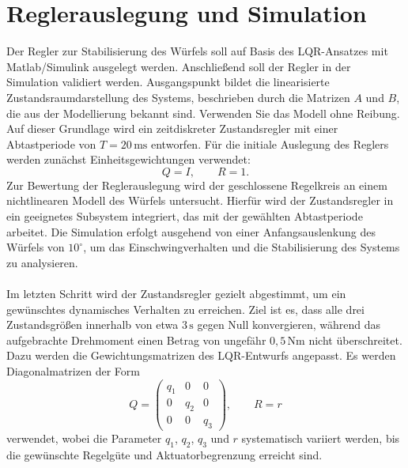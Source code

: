\chapter{Reglerauslegung und Simulation}
    \label{ch:Simulink}
    Der Regler zur Stabilisierung des Würfels soll auf Basis des LQR-Ansatzes mit Matlab/Simulink ausgelegt werden. Anschließend soll der Regler in der Simulation validiert werden. Ausgangspunkt bildet die linearisierte Zustandsraumdarstellung des Systems, beschrieben durch die Matrizen $A$ und $B$, die aus der Modellierung bekannt sind. Verwenden Sie das Modell ohne Reibung. Auf dieser Grundlage wird ein zeitdiskreter Zustandsregler mit einer Abtastperiode von $T = 20\,\mathrm{ms}$ entworfen. Für die initiale Auslegung des Reglers werden zunächst Einheitsgewichtungen verwendet:
    \[
        Q = I, \qquad R = 1.
    \]
    Zur Bewertung der Reglerauslegung wird der geschlossene Regelkreis an einem nichtlinearen Modell des Würfels untersucht. Hierfür wird der Zustandsregler in ein geeignetes Subsystem integriert, das mit der gewählten Abtastperiode arbeitet. Die Simulation erfolgt ausgehend von einer Anfangsauslenkung des Würfels von $10^\circ$, um das Einschwingverhalten und die Stabilisierung des Systems zu analysieren.\\
    \\
    Im letzten Schritt wird der Zustandsregler gezielt abgestimmt, um ein gewünschtes dynamisches Verhalten zu erreichen. Ziel ist es, dass alle drei Zustandsgrößen innerhalb von etwa $3\,\mathrm{s}$ gegen Null konvergieren, während das aufgebrachte Drehmoment einen Betrag von ungefähr $0{,}5\,\mathrm{Nm}$ nicht überschreitet. Dazu werden die Gewichtungsmatrizen des LQR-Entwurfs angepasst. Es werden Diagonalmatrizen der Form
    \[
        Q =
        \begin{pmatrix}
            q_1 & 0   & 0 \\
            0   & q_2 & 0 \\
            0   & 0   & q_3
        \end{pmatrix},
        \qquad
        R = r
    \]
    verwendet, wobei die Parameter $q_1$, $q_2$, $q_3$ und $r$ systematisch variiert werden, bis die gewünschte Regelgüte und Aktuatorbegrenzung erreicht sind.
